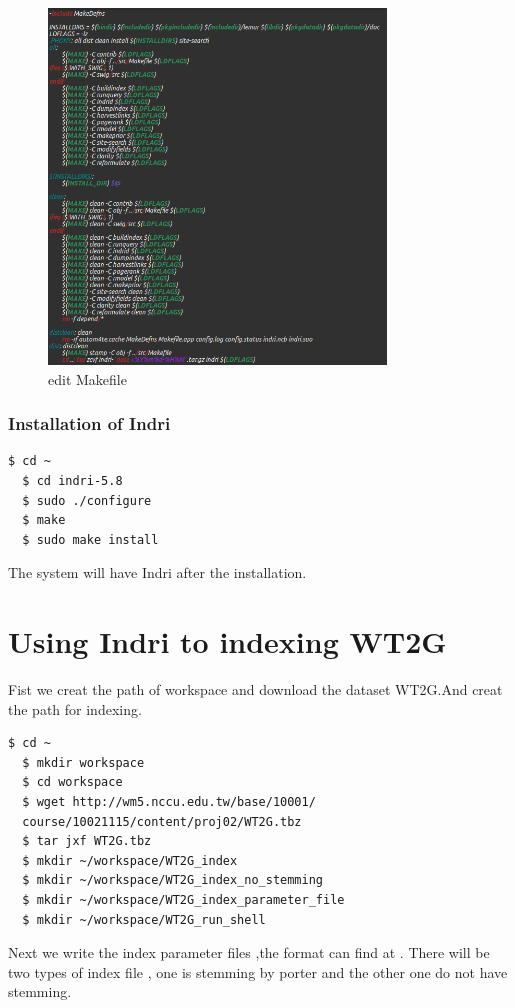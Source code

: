 \documentclass{article}
\begin{document}
\begin{figure}[H]
  \begin{center}
  \includegraphics[width=0.8\textwidth]{image/Makefile_edit.png}
  \caption{edit Makefile}
  \label{fig:env_05}
  \end{center}
\end{figure}

\subsubsection{Installation of Indri}
\begin{lstlisting}[language=bash,caption={Install Indri in bash}]
  $ cd ~
  $ cd indri-5.8
  $ sudo ./configure
  $ make
  $ sudo make install
\end{lstlisting}
The system will have Indri after the installation.
\newline\newline\newline\newline\newline
\section{Using Indri to indexing WT2G}

Fist we creat the path of workspace and download the dataset WT2G.And creat the path for indexing.
\begin{lstlisting}[language=bash,caption={ Download WT2G File}]
  $ cd ~
  $ mkdir workspace
  $ cd workspace
  $ wget http://wm5.nccu.edu.tw/base/10001/
  course/10021115/content/proj02/WT2G.tbz
  $ tar jxf WT2G.tbz
  $ mkdir ~/workspace/WT2G_index
  $ mkdir ~/workspace/WT2G_index_no_stemming
  $ mkdir ~/workspace/WT2G_index_parameter_file
  $ mkdir ~/workspace/WT2G_run_shell
\end{lstlisting}
Next we write the  index parameter files ,the format can find at \cite{ref3} .
There will be two types of index file , one is stemming by porter and the other one do not have stemming.
 
\end{document}
